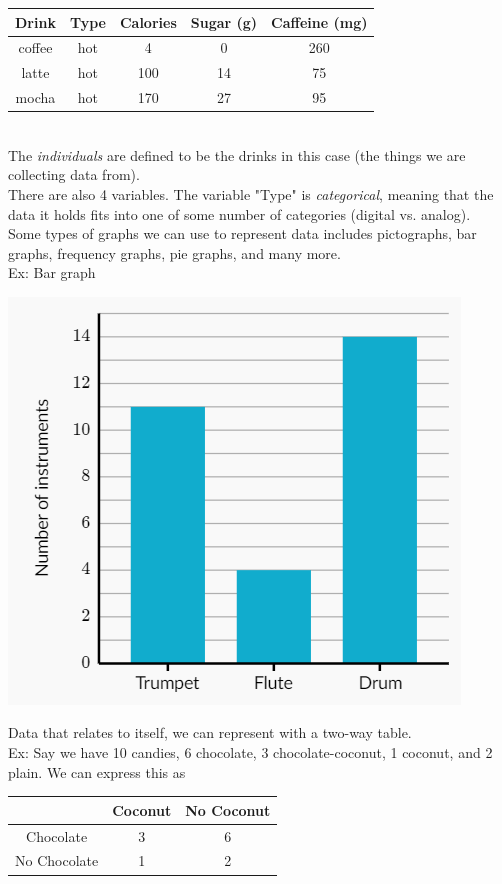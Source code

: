 \documentclass[11pt, fleqn]{article}
\begin{document}
\begin{tabular}{c|c|c|c|c}
    Drink & Type & Calories & Sugar (g) & Caffeine (mg)\\
    \hline
    coffee & hot & 4 & 0 & 260\\
    latte & hot & 100 & 14 & 75\\
    mocha & hot & 170 & 27 & 95
\end{tabular}\\
The \textit{individuals} are defined to be the drinks in this case (the things we are collecting data from).\\
There are also 4 variables. The variable "Type" is \textit{categorical}, meaning that the data it holds fits into one of some number of categories (digital vs. analog).\\
Some types of graphs we can use to represent data includes pictographs, bar graphs, frequency graphs, pie graphs, and many more.\\
Ex: Bar graph\\
\centerline{\includegraphics[scale=0.7]{FundamentalsPictures/barGraph.png}}
Data that relates to itself, we can represent with a two-way table.\\
Ex: Say we have 10 candies, 6 chocolate, 3 chocolate-coconut, 1 coconut, and 2 plain. We can express this as\\
\begin{tabular}{c|c|c}
    & Coconut & No Coconut\\
    \hline
    Chocolate & 3 & 6\\
    No Chocolate & 1 & 2
\end{tabular}\\
\end{document}
